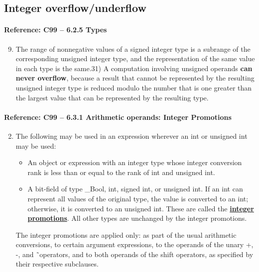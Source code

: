 \documentclass[11pt]{article}
\begin{document}
\subsection{Integer overflow/underflow}
\label{app:int}

\paragraph{Reference: C99 -- 6.2.5 Types}

\begin{enumerate}
\setcounter{enumi}{8}
\item The range of nonnegative values of a signed integer type is a subrange of the 
corresponding unsigned integer type, and the representation of the same value 
in each type is the same.31) A computation involving unsigned operands {\bf can 
never overflow}, because a result that cannot be represented by the resulting 
unsigned integer type is reduced modulo the number that is one greater than 
the largest value that can be represented by the resulting type. 
\end{enumerate}

\paragraph{Reference:  C99 -- 6.3.1 Arithmetic operands: Integer Promotions}
\begin{enumerate}
\setcounter{enumi}{1}
\item The following may be used in an expression wherever an int or unsigned int may be used:
\begin{itemize}
\item An object or expression with an integer type whose integer conversion rank is less
than or equal to the rank of int and unsigned int.
\item A bit-field of type \_Bool, int, signed int, or unsigned int.
If an int can represent all values of the original type, the value is converted to an 
int; otherwise, it is converted to an unsigned int. These are called the 
\underline{\bf integer promotions}. All other types are unchanged by the integer promotions.
\end{itemize}
The integer promotions are applied only: as part of the usual arithmetic conversions, 
to certain argument expressions, to the operands of the unary +, -, and \~\  operators, 
and to both operands of the shift operators, as specified by their respective subclauses.
\end{enumerate}
\end{document}
